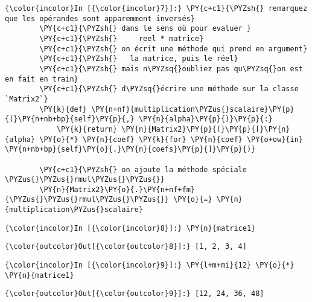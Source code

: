     \begin{Verbatim}[commandchars=\\\{\},frame=single,framerule=0.3mm,rulecolor=\color{cellframecolor}]
{\color{incolor}In [{\color{incolor}7}]:} \PY{c+c1}{\PYZsh{} remarquez que les opérandes sont apparemment inversés}
        \PY{c+c1}{\PYZsh{} dans le sens où pour evaluer }
        \PY{c+c1}{\PYZsh{}     reel * matrice}
        \PY{c+c1}{\PYZsh{} on écrit une méthode qui prend en argument}
        \PY{c+c1}{\PYZsh{}   la matrice, puis le réel}
        \PY{c+c1}{\PYZsh{} mais n\PYZsq{}oubliez pas qu\PYZsq{}on est en fait en train}
        \PY{c+c1}{\PYZsh{} d\PYZsq{}écrire une méthode sur la classe `Matrix2`}
        \PY{k}{def} \PY{n+nf}{multiplication\PYZus{}scalaire}\PY{p}{(}\PY{n+nb+bp}{self}\PY{p}{,} \PY{n}{alpha}\PY{p}{)}\PY{p}{:}
            \PY{k}{return} \PY{n}{Matrix2}\PY{p}{(}\PY{p}{[}\PY{n}{alpha} \PY{o}{*} \PY{n}{coef} \PY{k}{for} \PY{n}{coef} \PY{o+ow}{in} \PY{n+nb+bp}{self}\PY{o}{.}\PY{n}{coefs}\PY{p}{]}\PY{p}{)}
        
        \PY{c+c1}{\PYZsh{} on ajoute la méthode spéciale \PYZus{}\PYZus{}rmul\PYZus{}\PYZus{}}
        \PY{n}{Matrix2}\PY{o}{.}\PY{n+nf+fm}{\PYZus{}\PYZus{}rmul\PYZus{}\PYZus{}} \PY{o}{=} \PY{n}{multiplication\PYZus{}scalaire}
\end{Verbatim}


    \begin{Verbatim}[commandchars=\\\{\},frame=single,framerule=0.3mm,rulecolor=\color{cellframecolor}]
{\color{incolor}In [{\color{incolor}8}]:} \PY{n}{matrice1}
\end{Verbatim}


\begin{Verbatim}[commandchars=\\\{\},frame=single,framerule=0.3mm,rulecolor=\color{cellframecolor}]
{\color{outcolor}Out[{\color{outcolor}8}]:} [1, 2, 3, 4]
\end{Verbatim}
            
    \begin{Verbatim}[commandchars=\\\{\},frame=single,framerule=0.3mm,rulecolor=\color{cellframecolor}]
{\color{incolor}In [{\color{incolor}9}]:} \PY{l+m+mi}{12} \PY{o}{*} \PY{n}{matrice1}
\end{Verbatim}


\begin{Verbatim}[commandchars=\\\{\},frame=single,framerule=0.3mm,rulecolor=\color{cellframecolor}]
{\color{outcolor}Out[{\color{outcolor}9}]:} [12, 24, 36, 48]
\end{Verbatim}
            

    
    
    
